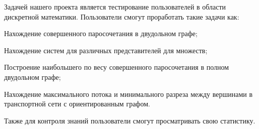 Задачей нашего проекта является тестирование пользователей в области дискретной математики. Пользователи смогут проработать такие задачи как\+:


\begin{DoxyEnumerate}
\item Нахождение совершенного паросочетания в двудольном графе;
\item Нахождение систем для различных представителей для множеств;
\item Построение наибольшего по весу совершенного паросочетания в полном двудольном графе;
\item Нахождение максимального потока и минимального разреза между вершинами в транспортной сети с ориентированным графом.
\end{DoxyEnumerate}

Также для контроля знаний пользователи смогут просматривать свою статистику. 